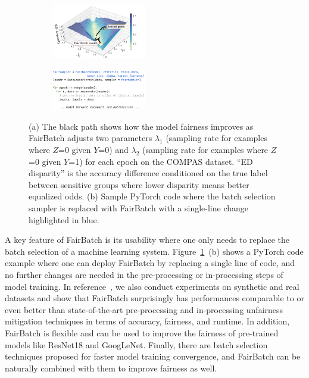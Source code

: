 \documentclass[11pt]{article}
\newcommand{\fb}{FairBatch}
\begin{document}
\begin{figure}[t]
\centering
\begin{subfigure}%
\centering
\includegraphics[width=0.45\textwidth,trim=0cm 0.25cm 0cm 0cm]{submissions/responsible-ai/figs/Grid_COMPAS_eqodds_3d.pdf}
\end{subfigure}
\begin{subfigure}%
\centering
\includegraphics[width=0.45\textwidth]{submissions/responsible-ai/figs/pseudo_code_PyTorch_simple.pdf}
\end{subfigure}
\caption{(a) The black path shows how the model fairness improves as \fb{} adjusts two parameters $\lambda_1$ (sampling rate for examples where $Z$=0 given $Y$=0) and $\lambda_2$ (sampling rate for examples where $Z$=0 given $Y$=1) for each epoch on the COMPAS dataset. ``ED disparity'' is the accuracy difference conditioned on the true label between sensitive groups where lower disparity means better equalized odds.
(b) Sample PyTorch code where the batch selection sampler is replaced with \fb{} with a single-line change highlighted in {\color{blue(ryb)} blue}.}
\label{fig:gridtorch}
\end{figure}

A key feature of \fb{} is its usability where one only needs to replace the batch selection of a machine learning system. Figure~\ref{fig:gridtorch}~(b) shows a PyTorch code example where one can deploy \fb{} by replacing a single line of code, and no further changes are needed in the pre-processing or in-processing steps of model training.
%
In reference~\cite{fairbatch}, we also conduct experiments on synthetic and real datasets and show that \fb{} surprisingly has performances comparable to or even better than state-of-the-art pre-processing and in-processing unfairness mitigation techniques in terms of accuracy, fairness, and runtime. In addition, \fb{} is flexible and can be used to improve the fairness of pre-trained models like ResNet18 and GoogLeNet. Finally, there are batch selection techniques proposed for faster model training convergence, and \fb{} can be naturally combined with them to improve fairness as well. 
\end{document}
